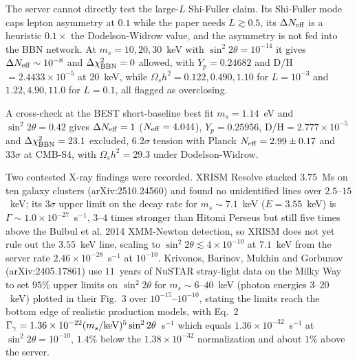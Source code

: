 \documentclass[11pt,a4paper]{article}
\begin{document}
The server cannot directly test the large-$L$ Shi-Fuller claim. Its Shi-Fuller mode caps lepton asymmetry at $0.1$ while the paper needs $L\gtrsim0.5$, its $\Delta N_{\rm eff}$ is a heuristic $0.1\times$ the Dodelson-Widrow value, and the asymmetry is not fed into the BBN network. At $m_{s}=10,20,30$~keV with $\sin^{2}2\theta=10^{-14}$ it gives $\Delta N_{\rm eff}\sim10^{-8}$ and $\Delta\chi^{2}_{\rm BBN}=0$ allowed, with $Y_{p}=0.24682$ and D/H$=2.4433\times10^{-5}$ at $20$~keV, while $\Omega_{s}h^{2}=0.122,0.490,1.10$ for $L=10^{-3}$ and $1.22,4.90,11.0$ for $L=0.1$, all flagged as overclosing.

A cross-check at the BEST short-baseline best fit $m_{s}=1.14$~eV and $\sin^{2}2\theta=0.42$ gives $\Delta N_{\rm eff}=1$ ($N_{\rm eff}=4.044$), $Y_{p}=0.25956$, D/H$=2.777\times10^{-5}$ and $\Delta\chi^{2}_{\rm BBN}=23.1$ excluded, $6.2\sigma$ tension with Planck $N_{\rm eff}=2.99\pm0.17$ and $33\sigma$ at CMB-S4, with $\Omega_{s}h^{2}=29.3$ under Dodelson-Widrow.

Two contested X-ray findings were recorded. XRISM Resolve stacked $3.75$~Ms on ten galaxy clusters (arXiv:2510.24560) and found no unidentified lines over $2.5$--$15$~keV; its $3\sigma$ upper limit on the decay rate for $m_{s}\sim7.1$~keV ($E=3.55$~keV) is $\Gamma\sim1.0\times10^{-27}$~s$^{-1}$, $3$--$4$ times stronger than Hitomi Perseus but still five times above the Bulbul et al. 2014 XMM-Newton detection, so XRISM does not yet rule out the $3.55$~keV line, scaling to $\sin^{2}2\theta\lesssim4\times10^{-10}$ at $7.1$~keV from the server rate $2.46\times10^{-28}$~s$^{-1}$ at $10^{-10}$. Krivonos, Barinov, Mukhin and Gorbunov (arXiv:2405.17861) use $11$~years of NuSTAR stray-light data on the Milky Way to set $95\%$ upper limits on $\sin^{2}2\theta$ for $m_{s}\sim6$--$40$~keV (photon energies $3$--$20$~keV) plotted in their Fig.~3 over $10^{-15}$--$10^{-10}$, stating the limits reach the bottom edge of realistic production models, with Eq.~2 $\Gamma_{\gamma}=1.36\times10^{-22}(m_{s}/{\rm keV})^{5}\sin^{2}2\theta$~s$^{-1}$ which equals $1.36\times10^{-32}$~s$^{-1}$ at $\sin^{2}2\theta=10^{-10}$, $1.4\%$ below the $1.38\times10^{-32}$ normalization and about $1\%$ above the server.
\end{document}

